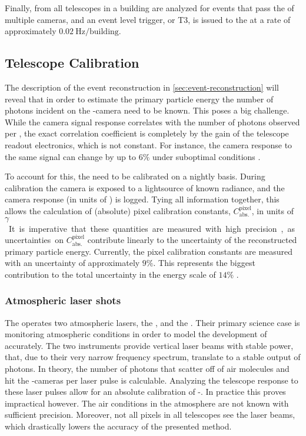 Finally, \TLTs from all telescopes in a building are analyzed for events that
pass the \FOV of multiple cameras, and an event level trigger, or T3, is issued
to the \CDAS at a rate of approximately 
$\SI{0.02}{\hertz\per\mathrm{building}}$.

\subsection{Telescope Calibration}
\label{ssec:fd-calibration}

The description of the event reconstruction in \cref{sec:event-reconstruction}
will reveal that in order to estimate the primary particle energy the number of
photons incident on the \FD-camera need to be known. This poses a big challenge.
While the camera signal response correlates with the number of photons observed
per \EAS, the exact correlation coefficient is completely by the gain of the 
telescope readout electronics, which is not constant. For instance, the
camera response to the same signal can change by up to $6\%$ under suboptimal
conditions \cite{filipJumpsXYCalibration2024}.

To account for this, the \PMTs need to be calibrated on a nightly basis. During
calibration the camera is exposed to a lightsource of known radiance, and the 
camera response (in units of \ADC) is logged. Tying all information together, 
this allows the calculation of (absolute) pixel calibration constants, 
$C^\mathrm{pixel}_\mathrm{abs.}$, in units of \SI{}{$\gamma$\per\ADC}. It is
imperative that these quantities are measured with high precision, as
uncertainties on $C^\mathrm{pixel}_\mathrm{abs.}$ contribute linearly to the 
uncertainty of the reconstructed primary particle energy. Currently, the pixel
calibration constants are measured with an uncertainty of approximately $9\%$.
This represents the biggest contribution to the total uncertainty in the \PAO 
energy scale of $14\%$ \cite{verziEnergyScalePierre2013}.

\subsubsection{Atmospheric laser shots}

The \PAO operates two atmospheric lasers, the \CLF, and the \XLF 
\cite{collaborationTechniquesMeasuringAerosol2013}. Their primary science case 
is monitoring atmospheric conditions in order to model the development of \EASs
accurately. The two instruments provide vertical laser beams with stable power,
that, due to their very narrow frequency spectrum, translate to a stable
output of photons. In theory, the number of photons that scatter off of air 
molecules and hit the \FD-cameras per laser pulse is calculable. Analyzing the
telescope response to these laser pulses allow for an absolute calibration of 
\FD-\PMTs. In practice this proves impractical however. The air conditions in 
the atmosphere are not known with sufficient precision. Moreover, not all
pixels in all telescopes see the laser beams, which drastically lowers the 
accuracy of the presented method.

